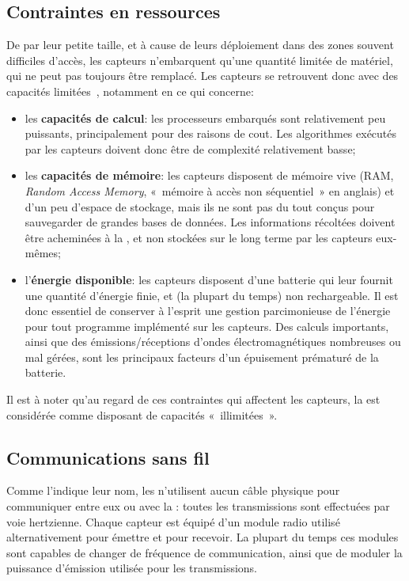     \subsection{Contraintes en ressources}
De par leur petite taille, et à cause de leurs déploiement dans des zones souvent difficiles d'accès, les capteurs n'embarquent qu'une quantité limitée de matériel, qui ne peut pas toujours être remplacé.
Les capteurs se retrouvent donc avec des capacités limitées~\cite{BMS13}, notamment en ce qui concerne:
\begin{itemize}
    \item les \textbf{capacités de calcul}: les processeurs embarqués sont relativement peu puissants, principalement pour des raisons de cout.
        Les algorithmes exécutés par les capteurs doivent donc être de complexité relativement basse;
    \item les \textbf{capacités de mémoire}: les capteurs disposent de mémoire vive (RAM, \textit{Random Access Memory}, « mémoire à accès non séquentiel » en anglais) et d'un peu d'espace de stockage, mais ils ne sont pas du tout conçus pour sauvegarder de grandes bases de données.
        Les informations récoltées doivent être acheminées à la \sdb, et non stockées sur le long terme par les capteurs eux-mêmes;
    \item l'\textbf{énergie disponible}: les capteurs disposent d'une batterie qui leur fournit une quantité d'énergie finie, et (la plupart du temps) non rechargeable.
        Il est donc essentiel de conserver à l'esprit une gestion parcimonieuse de l'énergie pour tout programme implémenté sur les capteurs.
        Des calculs importants, ainsi que des émissions/réceptions d'ondes électromagnétiques nombreuses ou mal gérées, sont les principaux facteurs d'un épuisement prématuré de la batterie.
\end{itemize}

Il est à noter qu'au regard de ces contraintes qui affectent les capteurs, la \sdb est considérée comme disposant de capacités « illimitées ».

\pagebreak %
    \subsection{Communications sans fil}
Comme l'indique leur nom, les \rcsfs n'utilisent aucun câble physique pour communiquer entre eux ou avec la \sdb: toutes les transmissions sont effectuées par voie hertzienne.
Chaque capteur est équipé d'un module radio utilisé alternativement pour émettre et pour recevoir.
La plupart du temps ces modules sont capables de changer de fréquence de communication, ainsi que de moduler la puissance d'émission utilisée pour les transmissions.

